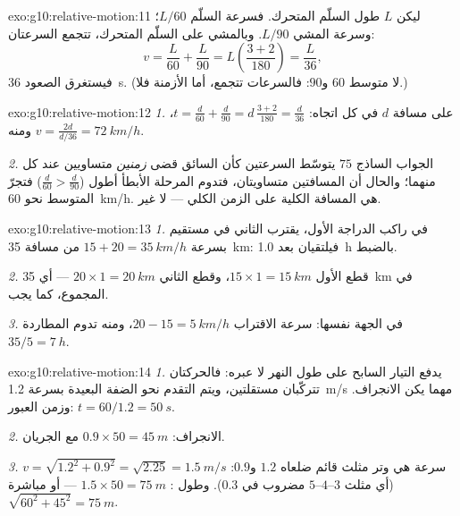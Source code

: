 \begin{solution}{exo:g10:relative-motion:11}
ليكن $L$ طول السلّم المتحرك. فسرعة السلّم $L/60$؛ وسرعة
المشي $L/90$. وبالمشي على السلّم المتحرك، تتجمع السرعتان:
\[
v = \frac{L}{60} + \frac{L}{90} = L\left(\frac{3 + 2}{180}\right)
= \frac{L}{36},
\]
فيستغرق الصعود \qty{36}{s}. (لا متوسط $60$ و$90$:
فالسرعات تتجمع، أما الأزمنة فلا.)
\end{solution}

\begin{solution}{exo:g10:relative-motion:12}
\emph{1.} على مسافة $d$ في كل اتجاه:
$t = \frac{d}{60} + \frac{d}{90} = d\,\frac{3 + 2}{180} = \frac{d}{36}$،
ومنه $v = \frac{2d}{d/36} = \qty{72}{km/h}$.

\emph{2.} الجواب الساذج $75$ يتوسّط السرعتين كأن السائق قضى
\emph{زمنين} متساويين عند كل منهما؛ والحال أن المسافتين متساويتان، فتدوم
المرحلة الأبطأ أطول ($\frac{d}{60} > \frac{d}{90}$) فتجرّ
المتوسط نحو \qty{60}{km/h}.  هي المسافة الكلية على
الزمن الكلي --- لا غير.
\end{solution}

\begin{solution}{exo:g10:relative-motion:13}
\emph{1.} في  راكب الدراجة الأول، يقترب الثاني في
مستقيم بسرعة $15 + 20 = \qty{35}{km/h}$ من مسافة \qty{35}{km}:
فيلتقيان بعد \qty{1.0}{h} بالضبط.

\emph{2.} قطع الأول $15 \times 1 = \qty{15}{km}$، وقطع الثاني
$20 \times 1 = \qty{20}{km}$ --- أي \qty{35}{km} في المجموع، كما يجب.

\emph{3.} في الجهة نفسها: سرعة الاقتراب $20 - 15 = \qty{5}{km/h}$، ومنه
تدوم المطاردة $35/5 = \qty{7}{h}$.
\end{solution}

\begin{solution}{exo:g10:relative-motion:14}
\emph{1.} يدفع التيار السابح على طول النهر لا عبره:
فالحركتان تتركّبان مستقلتين، ويتم التقدم نحو الضفة
البعيدة بسرعة \qty{1.2}{m/s} مهما يكن الانجراف. وزمن العبور:
$t = 60/1.2 = \qty{50}{s}$.

\emph{2.} الانجراف: $0.9 \times 50 = \qty{45}{m}$ مع الجريان.

\emph{3.} سرعة  هي وتر مثلث
قائم ضلعاه $1.2$ و$0.9$:
$v = \sqrt{1.2^2 + 0.9^2} = \sqrt{2.25} = \qty{1.5}{m/s}$ (أي مثلث $3$--$4$--$5$
مضروب في $0.3$). وطول : $1.5 \times 50 = \qty{75}{m}$
--- أو مباشرة $\sqrt{60^2 + 45^2} = \qty{75}{m}$.
\end{solution}

